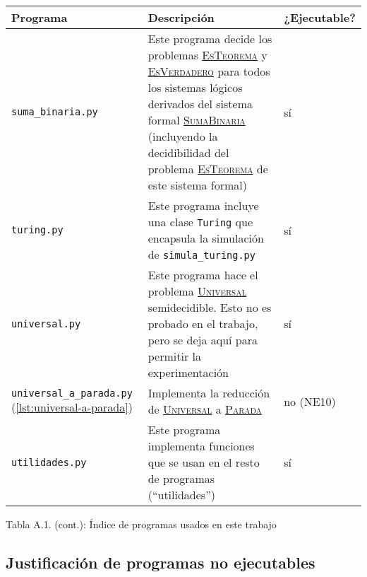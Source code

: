 \newpage

\vspace*{0.9cm}

\begin{tabularx}{\textwidth}{L{0.3} L{0.5} L{0.2}}
\midrule
Programa & Descripción & ¿Ejecutable? \\
\midrule
\texttt{suma\_binaria.py} & Este programa decide los problemas \hyperref[prob:es-teorema]{\textsc{EsTeorema}} y \hyperref[prob:es-verdadero]{\textsc{EsVerdadero}} para todos los sistemas lógicos derivados del sistema formal \hyperref[sf:suma-binaria]{\textsc{SumaBinaria}} (incluyendo la decidibilidad del problema \hyperref[prob:es-teorema]{\textsc{EsTeorema}} de este sistema formal) \vspace{4pt} & sí \\

\texttt{turing.py} & Este programa incluye una clase \texttt{Turing} que encapsula la simulación de \texttt{simula\_turing.py} \vspace{4pt} & sí \\

\texttt{universal.py} & Este programa hace el problema \hyperref[prob:universal]{\textsc{Universal}} semidecidible. Esto no es probado en el trabajo, pero se deja aquí para permitir la experimentación \vspace{4pt} & sí \\

\texttt{universal\_a\_parada.py} \linebreak \small{(\cref{lst:universal-a-parada})} & Implementa la reducción de \hyperref[prob:universal]{\textsc{Universal}} a \hyperref[prob:parada]{\textsc{Parada}} \vspace{4pt} & no (NE10) \\

\texttt{utilidades.py} & Este programa implementa funciones que se usan en el resto de programas (``utilidades'') \vspace{2pt} & sí \\

\midrule
\end{tabularx}
\vspace*{-0.2cm}
\begin{tabla}
\caption*{Tabla A.1. (cont.): Índice de programas usados en este trabajo}
\label{tab:indice-programas}
\end{tabla}

\subsection*{Justificación de programas no ejecutables}

